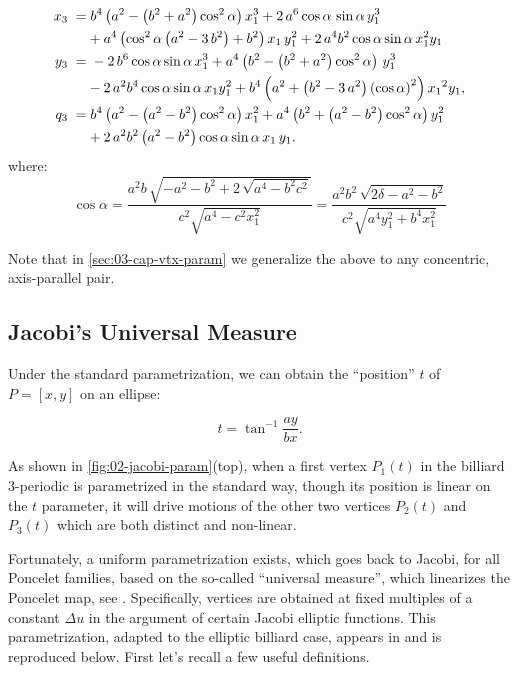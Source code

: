  \begin{equation} \label{eq:02-p3} \aligned 
x_{3}\; =& \; {b}^{4} \left( {a}^{2}- \left( {b}^{2}+{a}^{2} \right) 
 \cos^{2}\alpha\right)   x_1^{3}+2\, {a}^{6} 
 \cos \alpha\,\sin \alpha\, y_1^{3}\\
 &+{a}^{4} \left( 
  \cos^{2}  \alpha  \left( {a}^{2}-3\,{b}^{2}
 \right) +{b}^{2} \right) { x_1}\, y_1^{2}+2\,{a}^{4}{b}^{2} \cos  \alpha\sin \alpha\,   x_1^{2}{ y_1}
\\
y_{3} \;=&\; -2\, {b}^{6} \cos \alpha\sin \alpha\, x_1^{3}+
{a}^{4} \left( {b}^{2}- \left( {b}^{2}+{a}^{2} \right)   \cos^{2}  \alpha  \right)\,  y_1^{3}\\
& -2\,{a}^{2}  {b}^{4}\cos
 \alpha  \sin \alpha\,  x_1 y_1^{2}+
{b}^{4} \left( {a}^{2}+ \left( {b}^{2}-3\,{a}^{2} \right)  \left( \cos
 \alpha  \right) ^{2} \right) {{ x_1}}^{2}{ y_1},
\\
q_3 \;=& \; {b}^{4} \left( {a}^{2}- \left(a^2 -{b}^{2}  \right)   \cos^{2} \alpha   \right) x_1^{2}+{a}^{4} \left( {b}^{2}+ \left( a^2-{b}^{2}  \right)  \cos^{2} \alpha  \right)  y_1^{2}\\
&+2\,{a}^{2}{b}^{
2} \left( {a}^{2}-{b}^{2} \right) \cos \alpha \sin \alpha\, { x_1}\,{ y_1}.
\endaligned
%
\end{equation}
where:
\[\cos \alpha={\frac {a^2 b  \, \sqrt {-{a}^{2}-{b}^{2}+2\,\sqrt {{a}^{4}-{b}^{2}{c}^{2}}}}{{c}^{2}\sqrt {{a}^{4}-{c}^{2} x_1^{2}}}}=
\frac{  a^2 b^2 \, \sqrt {2\delta-{a}^{2}-{b}^{2}}} {c^2\sqrt{ a^4y_1^2 + b^4x_1^2}  } \]

Note that in \cref{sec:03-cap-vtx-param} we generalize the above to any concentric, axis-parallel pair.

\subsection{Jacobi's Universal Measure}
\label{sec:02-confocal-jacobi-param}

Under the standard parametrization, we can obtain the ``position'' $t$ of $P=[x,y]$ on an ellipse:

\[ t=\tan^{-1}{\frac{a y}{b x}}. \]

As shown in \cref{fig:02-jacobi-param}(top), when a first vertex $P_1(t)$ in the billiard 3-periodic is parametrized in the standard way, though its position is linear on the $t$ parameter, it will drive motions of the other two vertices $P_2(t)$ and $P_3(t)$ which are both distinct and non-linear. 

Fortunately, a uniform parametrization exists, which goes back to Jacobi, for all Poncelet families, based on the so-called ``universal measure'', which linearizes the Poncelet map, see \cite{koiller2021-spatial}. Specifically, vertices are obtained at fixed multiples of a constant $\Delta{u}$ in the argument of certain Jacobi elliptic functions. This parametrization, adapted to the elliptic billiard case, appears in \cite{stachel2021-billiards,stachel2021-billiards-param} and is reproduced below. First let's recall a few useful definitions. 

